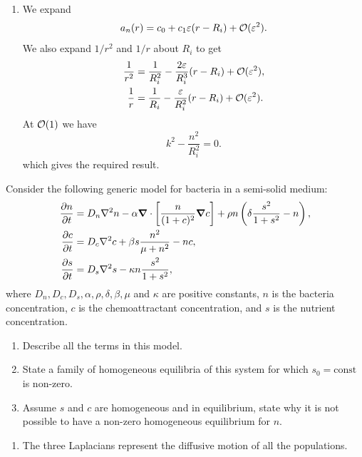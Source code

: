 \documentclass[a4paper, 12pt]{article}
\begin{document}
\begin{enumerate}[label={\bf \arabic{*}.\;}, ref={\arabic{*}},itemsep=3ex, left=0ex]
{\begin{enumerate}[label=(\alph*)]
{          }
        \item{
            We expand
            \begin{equation}
              a_n(r) = c_0 + c_1 \varepsilon (r-R_i) + \mathcal{O}(\varepsilon^2).
            \end{equation}
            We also expand $1/r^2$ and $1/r$ about $R_i$ to get
            \begin{align}
              \frac{1}{r^2} &= \frac{1}{R_i^2} -\frac{2\varepsilon }{R_i^3}(r-R_i) + \mathcal{O}(\varepsilon^2), \\
              \frac{1}{r} &= \frac{1}{R_i} -\frac{\varepsilon}{R_i^2}(r-R_i) + \mathcal{O}(\varepsilon^2).
            \end{align}
            At $\mathcal{O}(1)$ we have
            \begin{equation}
              k^2 - \frac{n^2}{R_i^2} =0.
            \end{equation}
            which gives the required result.
          }
      \end{enumerate}

    }


    {
      Consider the following generic model for bacteria in a semi-solid medium:
      \begin{subequations}
        \begin{align}
          \pd{n}{t} &=D_n\nabla^2 n - \alpha\vnabla\cdot\left[\frac{n}{(1+c)^2}\vnabla c\right] + \rho n \left(\delta\frac{s^2}{1+s^2} - n\right),\\
          \pd{c}{t}  &= D_c\nabla^2 c + \beta s\frac{n^2}{\mu + n^2} - n c,\\
          \pd{s}{t} &= D_s\nabla^2s - \kappa n \frac{s^2}{1+s^2},
        \end{align}
      \end{subequations}
      where $D_n,D_c,D_s,\alpha,\rho,\delta,\beta,\mu$ and $\kappa$ are positive constants, $n$ is the bacteria concentration, $c$ is the chemoattractant concentration, and $s$ is the nutrient concentration.
      \begin{enumerate}[label=(\alph*)]
        \item Describe all the terms in this model.
        \item State a family of homogeneous equilibria of this system for which $s_0=\text{const}$ is non-zero.
        \item Assume $s$ and $c$ are homogeneous and in equilibrium, state why it is not possible to have a non-zero homogeneous equilibrium for $n$.
      \end{enumerate}
    }
    {
      \begin{enumerate}[label=(\alph*)]
        \item{The three Laplacians represent the diffusive motion of all the populations.

}
\end{enumerate}}
\end{enumerate}
\end{document}
